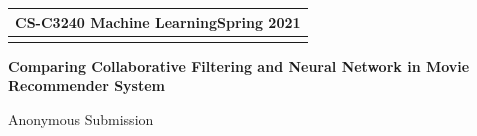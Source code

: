 \documentclass[a4paper,11pt]{article} %
\newcommand{\lineSpace}{1.1}
\newcommand{\exeNum}{}
\newcommand{\assType}{Comparing Collaborative Filtering and Neural Network in Movie Recommender System}
\newcommand{\courseName}{CS-C3240 Machine Learning}
\newcommand{\semester}{Spring 2021}
\newcommand{\studentName}{Anonymous Submission}
\begin{document}
\linespread{\lineSpace} %




\thispagestyle{empty} %

\begin{tabular}{p{15.5cm}} %
{\large \bf \courseName \hfill \semester} \\
\hline %
\\
\end{tabular} %


\begin{center} %
	{\Large \bf \assType\ \exeNum} %

	{\studentName\ } %
		
\end{center}  
% 


\end{document}

